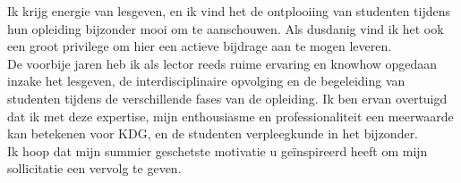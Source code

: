 \documentclass[11pt, a4paper]{awesome-cv} %
\begin{document}
\makecvheader %

\makelettertitle %


\begin{cvletter}


Ik krijg energie van lesgeven, en ik vind het de ontplooiing van studenten tijdens hun opleiding bijzonder mooi om te aanschouwen. Als dusdanig vind ik het ook een groot privilege om hier een actieve bijdrage aan te mogen leveren. \\

De voorbije jaren heb ik als lector reeds ruime ervaring en knowhow opgedaan inzake het lesgeven, de interdisciplinaire opvolging en de begeleiding van studenten tijdens de verschillende fases van de opleiding.
Ik ben ervan overtuigd dat ik met deze expertise, mijn enthousiasme en professionaliteit een meerwaarde kan betekenen voor KDG, en de studenten verpleegkunde in het bijzonder. \\ 

Ik hoop dat mijn summier geschetste motivatie u geïnspireerd heeft om mijn sollicitatie een vervolg te geven.



\vfill

\end{cvletter}


\makeletterclosing %
\end{document}
